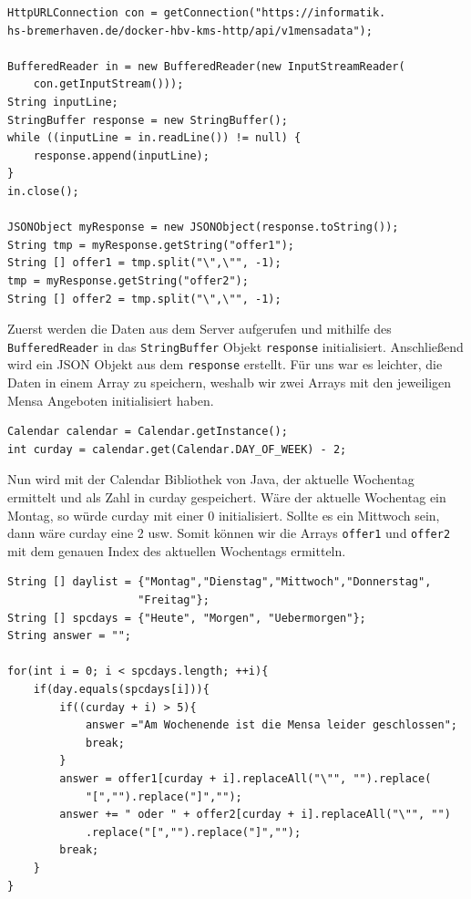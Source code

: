\begin{lstlisting}
HttpURLConnection con = getConnection("https://informatik.
hs-bremerhaven.de/docker-hbv-kms-http/api/v1mensadata");

BufferedReader in = new BufferedReader(new InputStreamReader(
    con.getInputStream()));
String inputLine;
StringBuffer response = new StringBuffer();
while ((inputLine = in.readLine()) != null) { 
    response.append(inputLine); 
}
in.close();

JSONObject myResponse = new JSONObject(response.toString());
String tmp = myResponse.getString("offer1");
String [] offer1 = tmp.split("\",\"", -1);
tmp = myResponse.getString("offer2");
String [] offer2 = tmp.split("\",\"", -1); 
\end{lstlisting}

Zuerst werden die Daten aus dem Server aufgerufen und mithilfe des \verb|BufferedReader| in das \verb|StringBuffer| Objekt \verb|response| initialisiert. 
Anschließend wird ein JSON Objekt aus dem \verb|response| erstellt. Für uns war es leichter, die Daten in einem Array zu speichern, weshalb 
wir zwei Arrays mit den jeweiligen Mensa Angeboten initialisiert haben.\\

\begin{lstlisting}
Calendar calendar = Calendar.getInstance();
int curday = calendar.get(Calendar.DAY_OF_WEEK) - 2;    
\end{lstlisting}

Nun wird mit der Calendar Bibliothek von Java, der aktuelle Wochentag ermittelt und als Zahl in curday gespeichert. 
Wäre der aktuelle Wochentag ein Montag, so würde curday mit einer 0 initialisiert. Sollte es ein Mittwoch sein, dann wäre curday eine 
2 usw. 
Somit können wir die Arrays \verb|offer1| und \verb|offer2| mit dem genauen Index des aktuellen Wochentags ermitteln.\\

\begin{lstlisting}
String [] daylist = {"Montag","Dienstag","Mittwoch","Donnerstag",
                    "Freitag"};
String [] spcdays = {"Heute", "Morgen", "Uebermorgen"};
String answer = "";

for(int i = 0; i < spcdays.length; ++i){
    if(day.equals(spcdays[i])){
        if((curday + i) > 5){
            answer ="Am Wochenende ist die Mensa leider geschlossen";
            break;
        }
        answer = offer1[curday + i].replaceAll("\"", "").replace(
            "[","").replace("]","");
        answer += " oder " + offer2[curday + i].replaceAll("\"", "")
            .replace("[","").replace("]","");
        break;
    }
}    
\end{lstlisting}

